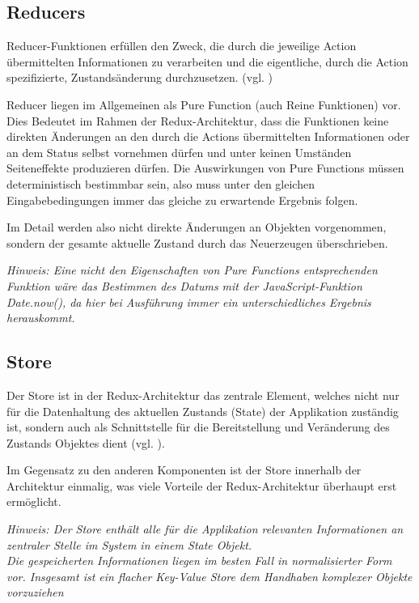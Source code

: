 \documentclass[bibliography=totoc,listof=totoc,BCOR=5mm,DIV=12,oneside]{scrbook}
\begin{document}
\subsection{Reducers}
\par Reducer-Funktionen erfüllen den Zweck, die durch die jeweilige Action übermittelten Informationen zu verarbeiten und die eigentliche, durch die Action spezifizierte, Zustandsänderung durchzusetzen. (vgl. \citep{ReduxReducers})
\par Reducer liegen im Allgemeinen als Pure Function (auch Reine Funktionen) vor. Dies Bedeutet im Rahmen der Redux-Architektur, dass die Funktionen keine direkten Änderungen an den durch die Actions übermittelten Informationen oder an dem Status selbst  vornehmen dürfen und unter keinen Umständen Seiteneffekte produzieren dürfen. Die Auswirkungen von Pure Functions müssen deterministisch bestimmbar sein, also muss unter den gleichen Eingabebedingungen immer das gleiche zu erwartende Ergebnis folgen.
\par Im Detail werden also nicht direkte Änderungen an Objekten vorgenommen, sondern der gesamte aktuelle Zustand durch das Neuerzeugen überschrieben.
\par \bigskip \textit{Hinweis: Eine nicht den Eigenschaften von Pure Functions entsprechenden Funktion wäre das Bestimmen des Datums mit der JavaScript-Funktion Date.now(), da hier bei Ausführung immer ein unterschiedliches Ergebnis herauskommt.}

\subsection{Store}
\par Der Store ist in der Redux-Architektur das zentrale Element, welches nicht nur für die Datenhaltung des aktuellen Zustands (State) der Applikation zuständig ist, sondern auch als Schnittstelle für die Bereitstellung und Veränderung des Zustands Objektes dient (vgl. \citep{ReduxStore}).
\par Im Gegensatz zu den anderen Komponenten ist der Store innerhalb der Architektur einmalig, was viele Vorteile der Redux-Architektur überhaupt erst ermöglicht.

\par \bigskip \textit{Hinweis: Der Store enthält alle für die Applikation relevanten Informationen an zentraler Stelle im System in einem State Objekt.\\
Die gespeicherten Informationen liegen im besten Fall in normalisierter Form vor. Insgesamt ist ein flacher Key-Value Store dem Handhaben komplexer Objekte vorzuziehen}
\end{document}
